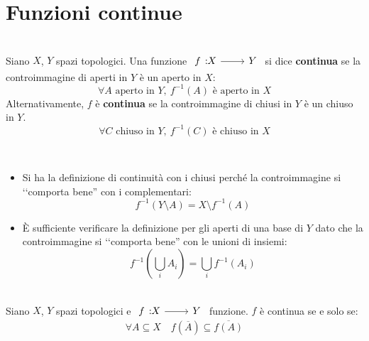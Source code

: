 \section{Funzioni continue}
\begin{define}~{}\\
Siano $X$, $Y$ spazi topologici. Una funzione $\funz{f}{X}{Y}$ si dice \textbf{continua} se la controimmagine di aperti in $Y$ è un aperto in $X$:
\begin{equation}
\forall A\text{ aperto in } Y,\ f^{-1}\left(A\right) \text{ è aperto in } X
\end{equation}
Alternativamente, $f$ è \textbf{continua} se la controimmagine di chiusi in $Y$ è un chiuso in $Y$.
\begin{equation}
	\forall C\text{ chiuso in } Y,\ f^{-1}\left(C\right) \text{ è chiuso in } X
\end{equation}
\vspace{-6mm}
\end{define}
\begin{observes}~{}
\begin{itemize}
\item Si ha la definizione di continuità con i chiusi perché la controimmagine si ‘‘comporta bene'' con i complementari:
\begin{equation*}
f^{-1}\left(Y\setminus A\right)=X\setminus f^{-1}\left(A\right)
\end{equation*}
\item È sufficiente verificare la definizione per gli aperti di una base di $Y$ dato che la controimmagine si ‘‘comporta bene'' con le unioni di insiemi:
\begin{equation*}
f^{-1}\left(\bigcup_{i}A_i\right)=\bigcup_{i}f^{-1}\left(A_i\right)
\end{equation*}
\end{itemize}
\vspace{-3mm}
\end{observes}
\begin{lemming}~{}\\
Siano $X$, $Y$ spazi topologici e $\funz{f}{X}{Y}$ funzione.
$f$ è continua se e solo se:
\begin{equation}
	\forall A\subseteq X\quad f\left(\overline{A}\right)\subseteq\overline{f\left(A\right)}
\end{equation}
\vspace{-6mm}
\end{lemming}
